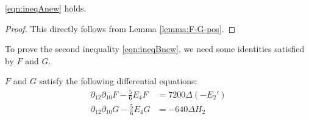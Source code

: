 \begin{corollary}\label{cor:ineqAnew}\leanok
\eqref{eqn:ineqAnew} holds.
\end{corollary}
\begin{proof}\leanok
This directly follows from Lemma \ref{lemma:F-G-pos}.
\end{proof}

To prove the second inequality \eqref{eqn:ineqBnew}, we need some identities satisfied by $F$ and $G$.
\begin{lemma}\label{lemma:FG-de}\leanok
$F$ and $G$ satisfy the following differential equations:
\begin{align}
    \partial_{12}\partial_{10} F - \frac{5}{6} E_{4} F &= 7200 \Delta (-E_{2}') \label{eqn:ddf} \\
    \partial_{12}\partial_{10} G - \frac{5}{6} E_{4} G &= -640 \Delta H_{2} \label{eqn:ddg}
\end{align}
\end{lemma}
